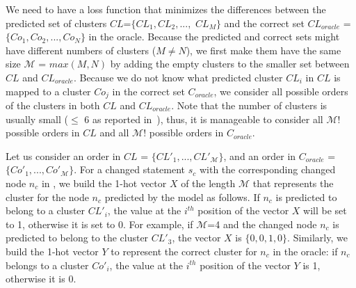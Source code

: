 

We need to have a loss function that minimizes the differences between
the predicted set of clusters $CL$=$\{CL_1,CL_2, ...,$ $CL_M\}$ and
the correct set $CL_{oracle}$ = $\{Co_{1}, Co_{2},..., Co_{N}\}$ in
the oracle. Because the predicted and correct sets might have
different numbers of clusters ($M \neq N$), we first make them have
the same size $\mathcal{M}$ = $max(M,N)$ by adding the empty clusters
to the smaller set between $CL$ and $CL_{oracle}$.
%
Because we do not know what predicted cluster $CL_i$ in $CL$ is mapped
to a cluster $Co_j$ in the correct set $C_{oracle}$, we consider all
possible orders of the clusters in both $CL$ and $CL_{oracle}$.
Note that the number of clusters is usually small ($\leq$ 6 as
reported in~\cite{nguyen-issre13}), thus, it is manageable to consider
all $\mathcal{M}!$ possible orders in $CL$ and all $\mathcal{M}!$
possible orders in $C_{oracle}$.

Let us consider an order in $CL$ = $\{CL'_1,..., CL'_{\mathcal{M}}\}$,
and an order in $C_{oracle}$ = $\{Co'_{1},..., Co'_{\mathcal{M}}\}$.
For a changed statement $s_c$ with the corresponding changed node
$n_c$ in {\mvpdg}, we build the 1-hot vector $X$ of the length
$\mathcal{M}$ that represents the cluster for the node $n_c$ predicted
by the model as follows. If $n_c$ is predicted to belong to a cluster
$CL'_{i}$, the value at the $i^{th}$ position of the vector $X$ will be set
to 1, otherwise it is set to 0. For example, if $\mathcal{M}$=4 and
the changed node $n_c$ is predicted to belong to the cluster $CL'_3$,
the vector $X$ is $\{0,0,1,0\}$.
Similarly, we build the 1-hot vector $Y$ to represent the correct
cluster for $n_c$ in the oracle: if $n_c$ belongs to a cluster
$Co'_{i}$, the value at the $i^{th}$ position of the vector $Y$ is 1,
otherwise it is 0.

